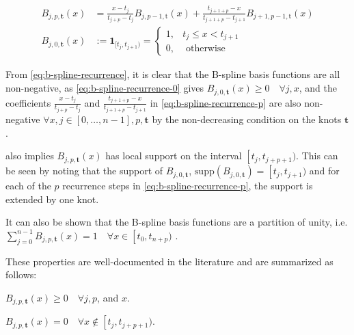 \begin{subequations}\label{eq:b-spline-recurrence}
    \begin{align}
        B_{j, p, \mathbf{t}}(x) & =\frac{x-t_j}{t_{j+p}-t_j} B_{j, p-1, \mathrm{t}}(x)+\frac{t_{j+1+p}-x}{t_{j+1+p}-t_{j+1}} B_{j+1, p-1, \mathrm{t}}(x) \label{eq:b-spline-recurrence-p} \\
        B_{j, 0, \mathbf{t}}(x) & := 
        \mathbf 1_{[t_j, t_{j+1})} =
        \begin{cases}
            1, & t_j \leq x<t_{j+1} \\
            0, & \text { otherwise }
        \end{cases} \label{eq:b-spline-recurrence-0}
    \end{align}
\end{subequations}

From \cref{eq:b-spline-recurrence}, it is clear that the B-spline basis functions are all non-negative, as \cref{eq:b-spline-recurrence-0} gives $B_{j, 0, \mathbf{t}}(x) \geq 0 \quad\forall j, x$, and the coefficients $\frac{x-t_j}{t_{j+p}-t_j}$ and $\frac{t_{j+1+p}-x}{t_{j+1+p}-t_{j+1}}$
in \cref{eq:b-spline-recurrence-p} are also non-negative $\forall x, j\in[0,\dots,n-1], p, \mathbf t$ by the non-decreasing condition on the knots $\mathbf t$. 

 also implies $B_{j, p, \mathbf{t}}(x)$ has local support on the interval $\left[t_j, t_{j+p+1}\right.)$. This can be seen by noting that the support of $B_{j, 0, \mathbf{t}}$, $\text{supp}(B_{j, 0, \mathbf{t}}) = \left[t_j, t_{j+1}\right.)$ and for each of the $p$ recurrence steps in \cref{eq:b-spline-recurrence-p}, the support is extended by one knot. 

It can also be shown that the B-spline basis functions are a partition of unity, i.e. $\sum_{j=0}^{n-1} B_{j, p, \mathbf{t}}(x) = 1 \quad\forall x \in \left[t_0, t_{n+p}\right.)$ \citep{deBoor1978practicalguide}.

These properties are well-documented in the literature and are summarized as follows:
\begin{property}[Nonnegativity]\label{b-prop:nonnegativity}
    $B_{j, p, \mathbf{t}}(x) \geq 0 \quad\forall j, p$, and $x$.
\end{property}

\begin{property}\label{b-prop:localsupport}
    $B_{j, p, \mathbf{t}}(x)=0 \quad\forall x \notin\left[t_j, t_{j+p+1}\right.)$.
\end{property}

